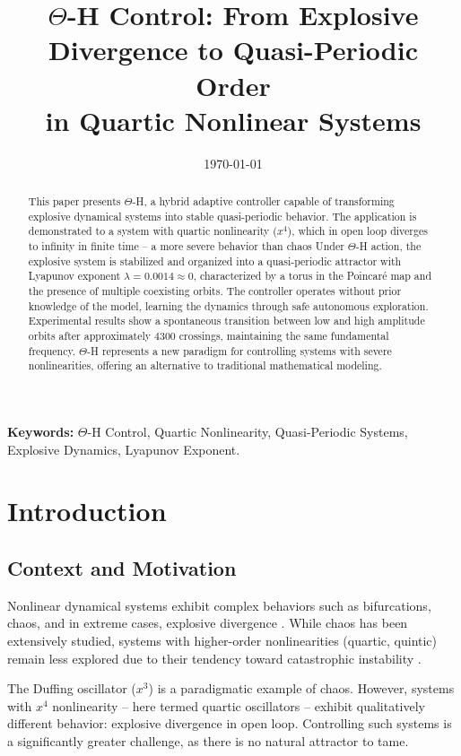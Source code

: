 \documentclass[twocolumn]{article}
\title{$\Theta$-H Control: From Explosive Divergence to Quasi-Periodic Order\\
\large{in Quartic Nonlinear Systems}}
\author{
\parbox{0.9\textwidth}
\centering
Marconi Kolm Madrid\\
\texttt{madrid@unicamp.br}\\
[0.5em]
Departamento de Sistemas de Energia\\
Faculdade de Engenharia Elétrica e de Computação\\
Universidade Estadual de Campinas (UNICAMP)
}
\date{\today}
\providecommand{\keywords}[1]{\textbf{Keywords:} #1}
\begin{document}
\maketitle

\begin{abstract}
This paper presents $\Theta$-H, a hybrid adaptive controller capable 
of transforming explosive dynamical systems into stable quasi-periodic 
behavior. The application is demonstrated to a system with quartic nonlinearity ($x^4$), which in open loop diverges to infinity in finite time -- a more severe behavior than chaos Under $\Theta$-H 
action, the explosive system is stabilized and organized into a 
quasi-periodic attractor with Lyapunov exponent $\lambda = 0.0014 
\approx 0$, characterized by a torus in the Poincar\'e map and the 
presence of multiple coexisting orbits. The controller operates 
without prior knowledge of the model, learning the dynamics through 
safe autonomous exploration. Experimental results show a spontaneous 
transition between low and high amplitude orbits after approximately 
4300 crossings, maintaining the same fundamental frequency. $\Theta$-H 
represents a new paradigm for controlling systems with severe 
nonlinearities, offering an alternative to traditional mathematical 
modeling.
\end{abstract}

\keywords{$\Theta$-H Control, Quartic Nonlinearity, Quasi-Periodic 
Systems, Explosive Dynamics, Lyapunov Exponent.}

\section{Introduction}

\subsection{Context and Motivation}

Nonlinear dynamical systems exhibit complex behaviors such as 
bifurcations, chaos, and in extreme cases, explosive divergence 
\cite{Ueda1979, Lorenz1963, Ott1990}. While chaos has been extensively 
studied, systems with higher-order nonlinearities (quartic, quintic) 
remain less explored due to their tendency toward catastrophic 
instability \cite{Khalil2002}.

The Duffing oscillator ($x^3$) \cite{Ueda1979} is a paradigmatic 
example of chaos. However, systems with $x^4$ nonlinearity -- here 
termed quartic oscillators -- exhibit qualitatively different behavior: 
explosive divergence in open loop. Controlling such systems is a 
significantly greater challenge, as there is no natural attractor 
to tame.
\end{document}

